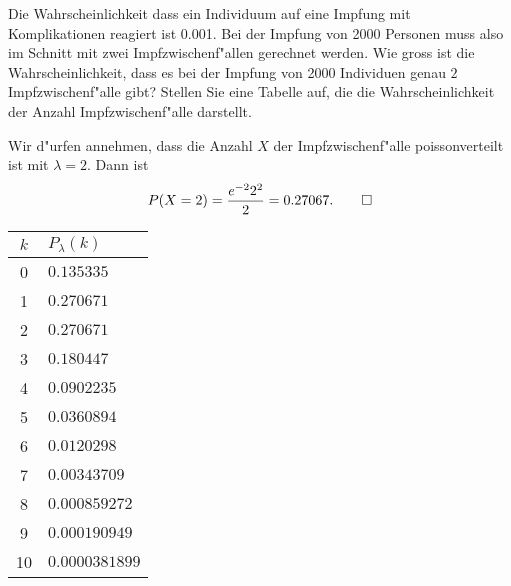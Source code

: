 Die Wahrscheinlichkeit dass ein Individuum auf eine Impfung
mit Komplikationen reagiert ist 0.001.
Bei der Impfung von 2000 Personen muss also im Schnitt
mit zwei Impfzwischenf"allen gerechnet werden.
Wie gross ist die Wahrscheinlichkeit, dass es
bei der Impfung von 2000 Individuen genau $2$ Impfzwischenf"alle
gibt? Stellen Sie eine Tabelle auf, die die Wahrscheinlichkeit
der Anzahl Impfzwischenf"alle darstellt.

\begin{loesung}
Wir d"urfen annehmen, dass die Anzahl $X$ der Impfzwischenf"alle
poissonverteilt ist mit $\lambda=2$. Dann ist
\[
P(X=2)=\frac{e^{-2}2^2}2=0.27067.
\qedhere
\]
\begin{center}
\begin{tabular}{|c|l|}
\hline
$k$&$P_\lambda(k)$\\
\hline
0&$0.135335$\\
1&$0.270671$\\
2&$0.270671$\\
3&$0.180447$\\
4&$0.0902235$\\
5&$0.0360894$\\
6&$0.0120298$\\
7&$0.00343709$\\
8&$0.000859272$\\
9&$0.000190949$\\
10&$0.0000381899$\\
\hline
\end{tabular}
\end{center}
\end{loesung}
